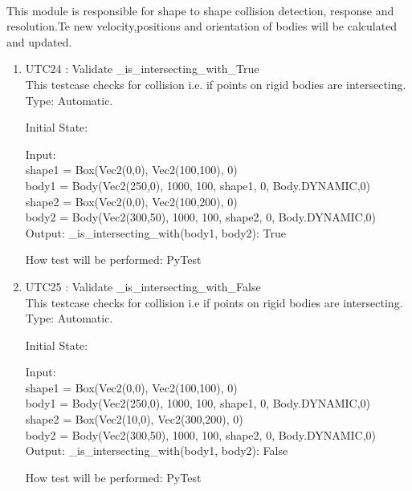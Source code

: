 \documentclass[12pt, titlepage]{article}
\begin{document}
\paragraph{}
This module is responsible for shape to shape collision detection, response and resolution.Te new velocity,positions and orientation of bodies will be calculated and updated.
\begin{enumerate}
	
	
	\item{UTC24} {: Validate \_is\_intersecting\_with\_True \\}
This testcase checks for collision i.e. if points on rigid bodies are intersecting.\\	
	Type: Automatic.
	
	Initial State: 
	
	Input: \\
	shape1 = Box(Vec2(0,0), Vec2(100,100), 0)\\
	body1 = Body(Vec2(250,0), 1000, 100, shape1, 0, Body.DYNAMIC,0)\\
	
	shape2 = Box(Vec2(0,0), Vec2(100,200), 0)\\
	body2 = Body(Vec2(300,50), 1000, 100, shape2, 0, Body.DYNAMIC,0)\\
	
	Output: \_is\_intersecting\_with(body1, body2): True
	
	How test will be performed: PyTest 
	
	\item{UTC25} {: Validate \_is\_intersecting\_with\_False \\}
	This testcase checks for collision i.e if points on rigid bodies are intersecting.\\	
	Type: Automatic.
	
	Initial State: 
	
	Input: \\
	shape1 = Box(Vec2(0,0), Vec2(100,100), 0)\\
	body1 =  Body(Vec2(250,0), 1000, 100, shape1, 0, Body.DYNAMIC,0)\\
	
	shape2 = Box(Vec2(10,0), Vec2(300,200), 0)\\
	body2 = Body(Vec2(300,50), 1000, 100, shape2, 0, Body.DYNAMIC,0)\\
	
	Output: \_is\_intersecting\_with(body1, body2): False
	
	How test will be performed: PyTest 
	
	
	
\end{enumerate}
\end{document}
